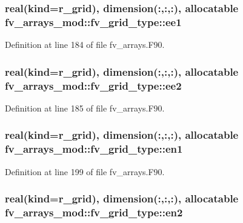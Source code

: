 \subsubsection[{ee1}]{\setlength{\rightskip}{0pt plus 5cm}real(kind={\bf r\-\_\-grid}), dimension(\-:,\-:,\-:), allocatable fv\-\_\-arrays\-\_\-mod\-::fv\-\_\-grid\-\_\-type\-::ee1}\label{structfv__arrays__mod_1_1fv__grid__type_a7a3fc16173527ef7fcc38253a91b8106}


Definition at line 184 of file fv\-\_\-arrays.\-F90.

\subsubsection[{ee2}]{\setlength{\rightskip}{0pt plus 5cm}real(kind={\bf r\-\_\-grid}), dimension(\-:,\-:,\-:), allocatable fv\-\_\-arrays\-\_\-mod\-::fv\-\_\-grid\-\_\-type\-::ee2}\label{structfv__arrays__mod_1_1fv__grid__type_a95aa43f23d9a854b1375b007d40c0863}


Definition at line 185 of file fv\-\_\-arrays.\-F90.

\subsubsection[{en1}]{\setlength{\rightskip}{0pt plus 5cm}real(kind={\bf r\-\_\-grid}), dimension(\-:,\-:,\-:), allocatable fv\-\_\-arrays\-\_\-mod\-::fv\-\_\-grid\-\_\-type\-::en1}\label{structfv__arrays__mod_1_1fv__grid__type_a73010b5fc69eb9e3e3369c5b5d1e8e79}


Definition at line 199 of file fv\-\_\-arrays.\-F90.

\subsubsection[{en2}]{\setlength{\rightskip}{0pt plus 5cm}real(kind={\bf r\-\_\-grid}), dimension(\-:,\-:,\-:), allocatable fv\-\_\-arrays\-\_\-mod\-::fv\-\_\-grid\-\_\-type\-::en2}\label{structfv__arrays__mod_1_1fv__grid__type_aeaa021081f07634bebf491c752ebff6a}


